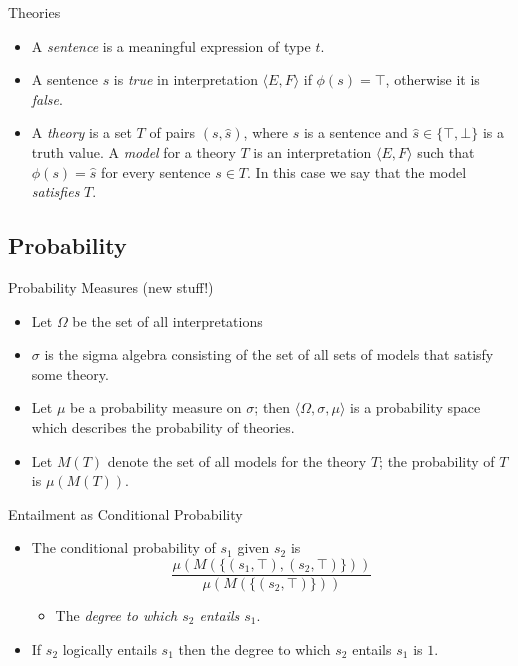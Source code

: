 \documentclass{beamer}
\newlength{\wideitemsep}
\let\olditem\item
\renewcommand{\item}{\setlength{\itemsep}{\wideitemsep}\olditem}
\begin{document}
\begin{frame}{Theories}
  \begin{itemize}
  \item A \emph{sentence} is a meaningful expression of type $t$.
  \item A sentence $s$ is \emph{true} in interpretation $\langle E,
    F\rangle$ if $\phi(s) = \top$, otherwise it is \emph{false}.
  \item A \emph{theory} is a set $T$ of pairs $(s,\hat{s})$, where $s$
    is a sentence and $\hat{s}\in\{\top,\bot\}$ is a truth value. A
    \emph{model} for a theory $T$ is an interpretation $\langle E,
    F\rangle$ such that $\phi(s) = \hat{s}$ for every sentence $s\in
    T$. In this case we say that the model \emph{satisfies} $T$.
  \end{itemize}
\end{frame}

\subsection{Probability}

\begin{frame}{Probability Measures (new stuff!)}
  \begin{itemize}
  \item Let $\Omega$ be the set of all interpretations
  \item $\sigma$ is the sigma algebra consisting of the set of all
    sets of models that satisfy some theory.
  \item Let $\mu$ be a probability measure on $\sigma$; then
    $\langle\Omega,\sigma,\mu\rangle$ is a probability space which
    describes the probability of theories.
  \item Let $M(T)$ denote the set of all models for the theory $T$;
    the probability of $T$ is $\mu(M(T))$.
  \end{itemize}
\end{frame}

\begin{frame}{Entailment as Conditional Probability}
  \begin{itemize}
  \item The conditional probability of $s_1$ given $s_2$ is
    $$\frac{\mu(M(\{(s_1, \top), (s_2, \top)\}))}{\mu(M(\{(s_2,\top)\}))}$$
    \begin{itemize}
    \item The {\em degree to which $s_2$ entails $s_1$\/}. 
    \end{itemize}
  \item If $s_2$ logically entails $s_1$ then the degree to which  $s_2$ entails $s_1$ is $1$.
\end{itemize}
\end{frame}
\end{document}
